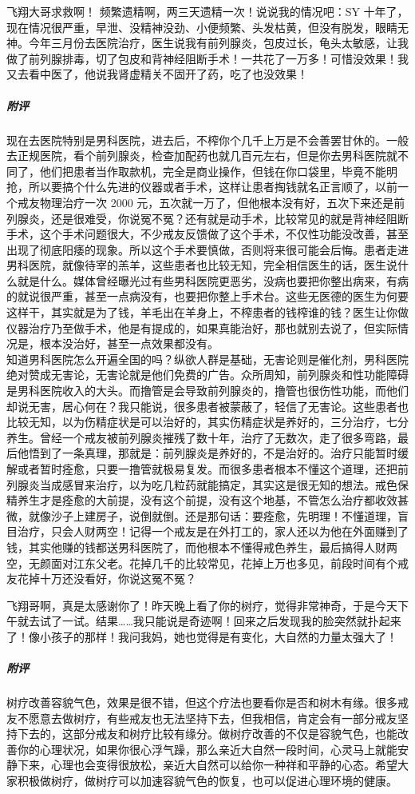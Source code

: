 \begin{case}
    飞翔大哥求救啊！ 频繁遗精啊，两三天遗精一次！说说我的情况吧：SY 十年了，现在情况很严重，早泄、没精神没劲、小便频繁、头发枯黄，但没有脱发，眼睛无神。今年三月份去医院治疗，医生说我有前列腺炎，包皮过长，龟头太敏感，让我做了前列腺排毒，切了包皮和背神经阻断手术！一共花了一万多！可惜没效果！我又去看中医了，他说我肾虚精关不固开了药，吃了也没效果！
    \subparagraph{附评} 现在去医院特别是男科医院，进去后，不榨你个几千上万是不会善罢甘休的。一般去正规医院，看个前列腺炎，检查加配药也就几百元左右，但是你去男科医院就不同了，他们把患者当作取款机，完全是商业操作，但钱在你口袋里，毕竟不能明抢，所以要搞个什么先进的仪器或者手术，这样让患者掏钱就名正言顺了，以前一个戒友物理治疗一次 2000 元，五次就一万了，但他根本没有好，五次下来还是前列腺炎，还是很难受，你说冤不冤？还有就是动手术，比较常见的就是背神经阻断手术，这个手术问题很大，不少戒友反馈做了这个手术，不仅性功能没改善，甚至出现了彻底阳痿的现象。所以这个手术要慎做，否则将来很可能会后悔。患者走进男科医院，就像待宰的羔羊，这些患者也比较无知，完全相信医生的话，医生说什么就是什么。媒体曾经曝光过有些男科医院更恶劣，没病也要把你整出病来，有病的就说很严重，甚至一点病没有，也要把你整上手术台。这些无医德的医生为何要这样干，其实就是为了钱，羊毛出在羊身上，不榨患者的钱榨谁的钱？医生让你做仪器治疗乃至做手术，他是有提成的，如果真能治好，那也就别去说了，但实际情况是，根本没治好，甚至一点效果都没有。\\
    知道男科医院怎么开遍全国的吗？纵欲人群是基础，无害论则是催化剂，男科医院绝对赞成无害论，无害论就是他们免费的广告。众所周知，前列腺炎和性功能障碍是男科医院收入的大头。而撸管是会导致前列腺炎的，撸管也很伤性功能，而他们却说无害，居心何在？我只能说，很多患者被蒙蔽了，轻信了无害论。这些患者也比较无知，以为伤精症状是可以治好的，其实伤精症状是养好的，三分治疗，七分养生。曾经一个戒友被前列腺炎摧残了数十年，治疗了无数次，走了很多弯路，最后他悟到了一条真理，那就是：前列腺炎是养好的，不是治好的。治疗只能暂时缓解或者暂时痊愈，只要一撸管就极易复发。而很多患者根本不懂这个道理，还把前列腺炎当成感冒来治疗，以为吃几粒药就能搞定，其实这是很无知的想法。戒色保精养生才是痊愈的大前提，没有这个前提，没有这个地基，不管怎么治疗都收效甚微，就像沙子上建房子，说倒就倒。还是那句话：要痊愈，先明理！不懂道理，盲目治疗，只会人财两空！记得一个戒友是在外打工的，家人还以为他在外面赚到了钱，其实他赚的钱都送男科医院了，而他根本不懂得戒色养生，最后搞得人财两空，无颜面对江东父老。花掉几千的比较常见，花掉上万也多见，前段时间有个戒友花掉十万还没看好，你说这冤不冤？
\end{case}

\begin{case}
    飞翔哥啊，真是太感谢你了！昨天晚上看了你的树疗，觉得非常神奇，于是今天下午就去试了一试。结果……我只能说是奇迹啊！回来之后发现我的脸突然就扑起来了！像小孩子的那样！我问我妈，她也觉得是有变化，大自然的力量太强大了！
    \subparagraph{附评} 树疗改善容貌气色，效果是很不错，但这个疗法也要看你是否和树木有缘。很多戒友不愿意去做树疗，有些戒友也无法坚持下去，但我相信，肯定会有一部分戒友坚持下去的，这部分戒友和树疗比较有缘分。做树疗改善的不仅是容貌气色，也能改善你的心理状况，如果你很心浮气躁，那么亲近大自然一段时间，心灵马上就能安静下来，心理也会变得很放松，亲近大自然可以给你一种祥和平静的心态。希望大家积极做树疗，做树疗可以加速容貌气色的恢复，也可以促进心理环境的健康。
\end{case}


